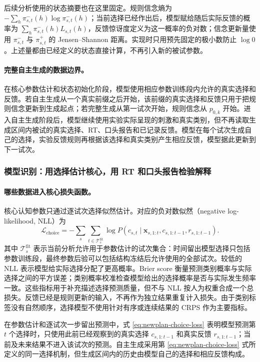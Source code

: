 后续分析使用的状态摘要也在这里固定。规则信念熵为 $-\sum_h\pi^-_{s,t}(h)\log\pi^-_{s,t}(h)$；当前选择已经作出后，模型赋给随后实际反馈的概率为 $\sum_h\pi^-_{s,t}(h)L_{s,t}(h)$，反馈惊讶度定义为这一概率的负对数；信念更新量使用 $\pi^-_{s,t}$ 与 $\pi^+_{s,t}$ 的 Jensen--Shannon 距离。实现时只用预先固定的极小数防止 $\log 0$。上述量都由已经定义的状态直接计算，不再引入新的被试参数。

\paragraph{完整自主生成的数据边界。}
在核心参数估计和状态初始化阶段，模型使用相应参数训练段内允许的真实选择和反馈。若自主生成从一个真实前缀之后开始，该前缀的真实选择和反馈只用于把规则信念更新到生成起点；若完整生成从第一试次开始，规则信念从 $p_{0,k}$ 开始。进入自主生成阶段后，模型继续使用实验实际呈现的刺激和真实类别，但不再读取生成区间内被试的真实选择、RT、口头报告和已记录反馈。模型在每个试次生成自己的选择，实验反馈规则再根据该选择和真实类别产生相应反馈，模型据此更新到下一试次。


\subsubsection{模型识别：用选择估计核心，用 RT 和口头报告检验解释}

\paragraph{哪些数据进入核心损失函数。}
核心认知参数只通过逐试次选择似然估计。对应的负对数似然（negative log-likelihood, NLL）为
\begin{equation}
    \mathcal L_{\mathrm{choice}}
    =-\sum_s\sum_{t\in\mathcal T_s^{\mathrm{fit}}}
    \log P(c_{s,t}\mid
      \mathbf x_{s,1:t},c_{s,1:t-1},r_{s,1:t-1}).
    \label{eq:newplan-choice-loss}
\end{equation}
其中 $\mathcal T_s^{\mathrm{fit}}$ 表示当前分析允许用于参数估计的试次集合：时间留出模型选择只包括参数训练段，最终参数后验可以包括结构冻结后允许使用的全部试次。较低的 NLL 表示模型给实际选择分配了更高概率。Brier score 衡量预测类别概率与实际选择之间的平方误差；类别概率校准检查模型给出的选择概率是否与实际发生频率一致。这些指标用于补充描述选择预测质量，但不与 NLL 按人为权重合成一个总损失。反馈已经是规则更新的输入，不再作为独立结果重复计入损失。由于类别标签没有自然顺序，选择模型不使用针对有序或连续结果的 CRPS 作为主要指标。

在参数估计和逐试次一步留出预测中，式 \ref{eq:newplan-choice-loss} 表明模型预测第 $t$ 个选择时，只使用此前已经观察到的真实选择 $c_{s,1:t-1}$ 和真实反馈 $r_{s,1:t-1}$；当前及未来结果不进入该试次的预测。自主生成采用第 \ref{eq:newplan-choice-loss} 式所定义的同一选择机制，但生成区间内的历史由模型自己的选择和相应反馈构成。

